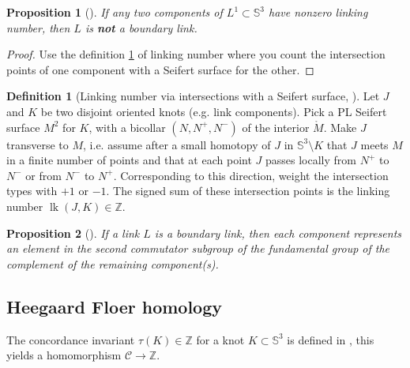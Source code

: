 \documentclass[nobib]{tufte-book} %
\newtheorem{proposition}{Proposition}
\theoremstyle{definition}
\newtheorem{definition}{Definition}
\theoremstyle{remark}
\DeclareMathOperator{\lk}{lk}
\newcommand{\sphere}[1]{\mathbb{S}^{#1}}
\newcommand{\Z}{\mathbb{Z}}
\begin{document}
\begin{proposition}[{\citep[5.E.1]{rolfsen2003knots}}]
	If any two components of $L^{1} \subset \sphere{3}$
	have nonzero linking number, then $L$ is \textbf{not}
	a boundary link.
\end{proposition}

\begin{proof}
	Use the definition \ref{def:linking_numbers_via_intersections_with_Seifert_surface} 
	of linking number where you count
	the intersection points of one component with a Seifert surface for the
	other.
\end{proof}

\begin{definition}[{Linking number via intersections with a Seifert surface,
	\citep[5.D.(2)]{rolfsen2003knots}}]
	\label{def:linking_numbers_via_intersections_with_Seifert_surface}
	Let $J$ and $K$ be two disjoint oriented knots (e.g. link components).
	Pick a PL Seifert surface $M^{2}$ for $K$, with
	a bicollar $(N, N^{+}, N^{-})$ of the interior $\mathring{M}$.
	Make $J$ transverse to $M$, i.e. assume after a small
	homotopy of $J$ in $\sphere{3} \setminus K$ that
	$J$ meets $M$ in a finite number of points
	and that at each point $J$ passes locally
	from $N^{+}$ to $N^{-}$ or from $N^{-}$ to $N^{+}$.
	Corresponding to this direction, weight the intersection types
	with $+1$ or $-1$.
	The signed sum of these intersection points is the linking
	number $\lk(J, K) \in \Z$.
\end{definition}

\begin{proposition}[{\citep[5.E.8]{rolfsen2003knots}}]
	If a link $L$ is a boundary link, then each component
	represents an element
	in the second commutator subgroup
	of the fundamental group of the complement
	of the remaining component(s).
\end{proposition}


\subsection{Heegaard Floer homology}

The concordance invariant $\tau(K) \in \Z$ for a knot $K \subset \sphere{3}$
is defined in \citep{ozsvath2003knot},
this yields a homomorphism $\mathcal{C} \rightarrow \Z$.
\end{document}

